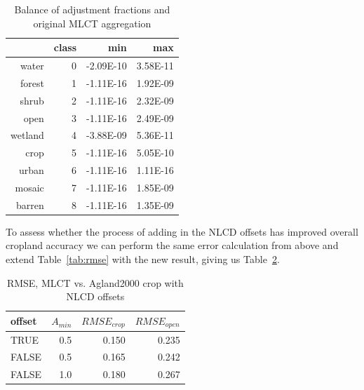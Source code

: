 \begin{table}[ht]
\begin{center}
\begin{tabular}{rrrr}
  \hline
 & class & min & max \\ 
  \hline
water & 0 & -2.09E-10 & 3.58E-11 \\ 
  forest & 1 & -1.11E-16 & 1.92E-09 \\ 
  shrub & 2 & -1.11E-16 & 2.32E-09 \\ 
  open & 3 & -1.11E-16 & 2.49E-09 \\ 
  wetland & 4 & -3.88E-09 & 5.36E-11 \\ 
  crop & 5 & -1.11E-16 & 5.05E-10 \\ 
  urban & 6 & -1.11E-16 & 1.11E-16 \\ 
  mosaic & 7 & -1.11E-16 & 1.85E-09 \\ 
  barren & 8 & -1.11E-16 & 1.35E-09 \\ 
   \hline
\end{tabular}
\caption{Balance of adjustment fractions and original MLCT aggregation}
\label{tab:restack_check}
\end{center}
\end{table}
To assess whether the process of adding in the NLCD offsets has
improved overall cropland accuracy we can perform the same error
calculation from above and extend Table~\ref{tab:rmse} with the new
result, giving us Table~\ref{tab:rmse2}.

\begin{table}[ht]
\begin{center}
\begin{tabular}{lrrr}
  \hline
offset & $A_{min}$ & $RMSE_{crop}$ & $RMSE_{open}$ \\ 
  \hline
TRUE & 0.5 & 0.150 & 0.235 \\ 
  FALSE & 0.5 & 0.165 & 0.242 \\ 
  FALSE & 1.0 & 0.180 & 0.267 \\ 
   \hline
\end{tabular}
\caption{RMSE, MLCT vs. Agland2000 crop with NLCD offsets}
\label{tab:rmse2}
\end{center}
\end{table}

